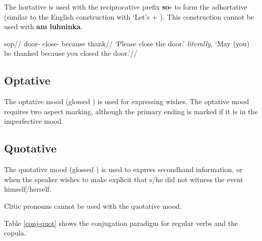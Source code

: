 \par The hortative is used with the reciprocative prefix \textbf{so-} to form the adhortative (similar to the English construction with `Let's + ). This construction cannot be used with \textbf{am luhninka}.

\pex
\begingl
\gla sop//
\glb door- close-  because thank//
\glft  `Please close the door.' \textit{literally,} `May (you) be thanked because you closed the door.'//
\endgl
\xe

\subsection{Optative}
The optative mood (glossed ) is used for expressing wishes. The optative mood requires two aspect marking, although the primary ending is marked if it is in the imperfective mood.



\subsection{Quotative }
\par The quotative mood (glossed ) is used to express secondhand information, or when the speaker wishes to make explicit that s/he did not witness the event himself/herself.
\par Clitic pronouns cannot be used with the quotative mood.
\par Table \ref{conj-quot} shows the conjugation paradigm for regular verbs and the copula.



